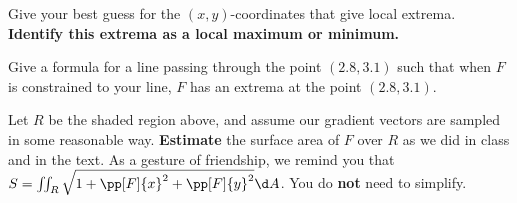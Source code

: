 \documentclass{ximera}
\begin{document}
\begin{exercise}
  Give your best guess for the $(x,y)$-coordinates that give local
  extrema. \textbf{Identify this extrema as a local maximum or minimum.}
\end{exercise}

\begin{exercise}
  Give a formula for a line passing through the point $(2.8, 3.1)$
  such that when $F$ is constrained to your line, $F$ has an extrema
  at the point $(2.8, 3.1)$.

\end{exercise}

\begin{exercise}
  Let $R$ be the shaded region above, and assume our gradient vectors
  are sampled in some reasonable way.  \textbf{Estimate} the surface
  area of $F$ over $R$ as we did in class and in the text.  As a
  gesture of friendship, we remind you that $S = \iint_R \sqrt{1+
    \pp[F]{x}^2 + \pp[F]{y}^2} \d A$. You do \textbf{not} need to
  simplify.
\end{exercise}
\end{document}
